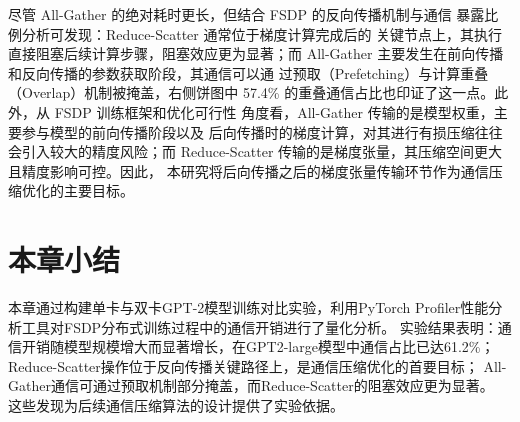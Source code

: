 尽管 All-Gather 的绝对耗时更长，但结合 FSDP 的反向传播机制与通信
暴露比例分析可发现：Reduce-Scatter 通常位于梯度计算完成后的
关键节点上，其执行直接阻塞后续计算步骤，阻塞效应更为显著；而
All-Gather 主要发生在前向传播和反向传播的参数获取阶段，其通信可以通
过预取（Prefetching）与计算重叠（Overlap）机制被掩盖，右侧饼图中 57.4\%
的重叠通信占比也印证了这一点。此外，从 FSDP 训练框架和优化可行性
角度看，All-Gather 传输的是模型权重，主要参与模型的前向传播阶段以及
后向传播时的梯度计算，对其进行有损压缩往往会引入较大的精度风险；而
Reduce-Scatter 传输的是梯度张量，其压缩空间更大且精度影响可控。因此，
本研究将后向传播之后的梯度张量传输环节作为通信压缩优化的主要目标。

\section{本章小结}

本章通过构建单卡与双卡GPT-2模型训练对比实验，利用PyTorch Profiler性能分析工具对FSDP分布式训练过程中的通信开销进行了量化分析。
实验结果表明：通信开销随模型规模增大而显著增长，在GPT2-large模型中通信占比已达61.2\%；
Reduce-Scatter操作位于反向传播关键路径上，是通信压缩优化的首要目标；
All-Gather通信可通过预取机制部分掩盖，而Reduce-Scatter的阻塞效应更为显著。
这些发现为后续通信压缩算法的设计提供了实验依据。

